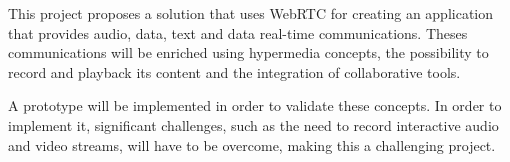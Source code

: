 \documentclass{llncs}
\begin{document}
  This project proposes a solution that uses \ac{WebRTC} for creating an application that provides audio, data, text and data real-time communications. Theses communications will be enriched using hypermedia concepts, the possibility to record and playback its content and the integration of collaborative tools.

  A prototype will be implemented in order to validate these concepts.
In order to implement it, significant challenges, such as the need to record interactive audio and video streams, will have to be overcome, making this a challenging project.



\end{document}
